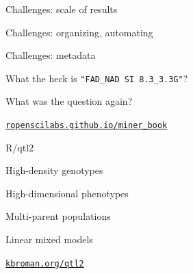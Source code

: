 \documentclass[12pt,t]{beamer}
\begin{document}
\begin{frame}[c]{Challenges: {\color{foreground} scale of results}}


\end{frame}




\begin{frame}[c]{Challenges: {\color{foreground} organizing, automating}}


\end{frame}


\begin{frame}[c]{Challenges: {\color{foreground} metadata}}


  \centerline{What the heck is {\hilit \tt "FAD\_NAD SI 8.3\_3.3G"}?}

\end{frame}



\begin{frame}[c]{}
\centerline{\Large What was the question again?}
\end{frame}



\begin{frame}[c]{}

  \vspace*{5mm}



\vspace{3mm}

\hfill \href{https://ropenscilabs.github.io/miner_book}{\scriptsize \lolit \tt ropenscilabs.github.io/miner\_book}

\end{frame}



\begin{frame}[c]{R/qtl2}

\vspace*{-16.2mm}

  \vspace{21mm}

  \bbi
\item High-density genotypes
\item High-dimensional phenotypes
\item Multi-parent populations
\item Linear mixed models
  \ei

  \vspace{25mm}

\hfill \href{http://kbroman.org/qtl2}{\small \tt kbroman.org/qtl2}

\end{frame}
\end{document}
